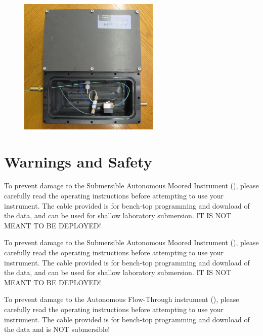     \begin{figure}[h]
    \centering
    \includegraphics[width=0.6\textwidth]{figs/AFT_wet.jpg}
    \label{fig:AFTwet1}
    \end{figure}

\fi	%

\newpage
\restoregeometry


\section*{Warnings and Safety}
\label{sec:Warning}

\ifcase \inst	%

To prevent damage to the Submersible Autonomous Moored Instrument (\instType{}), please carefully read the operating instructions before attempting to use your instrument. The cable provided is for bench-top programming and download of the \instType{} data, and can be used for shallow laboratory submersion.  IT IS NOT MEANT TO BE DEPLOYED!

\or			%

To prevent damage to the Submersible Autonomous Moored Instrument (\instType{}), please carefully read the operating instructions before attempting to use your instrument. The cable provided is for bench-top programming and download of the \instType{} data, and can be used for shallow laboratory submersion.  IT IS NOT MEANT TO BE DEPLOYED!

\or			%

To prevent damage to the Autonomous Flow-Through instrument (\instType{}), please carefully read the operating instructions before attempting to use your instrument. The cable provided is for bench-top programming and download of the \instType{} data and is NOT submersible!

